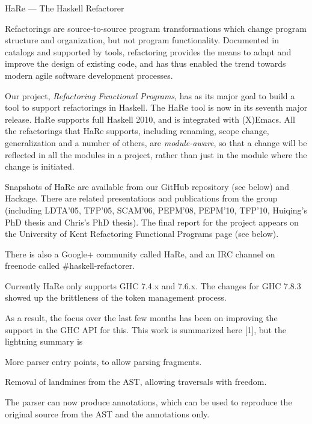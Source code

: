 \begin{hcarentry}[updated]{HaRe --- The Haskell Refactorer}
\label{hare}
\makeheader

Refactorings are source-to-source program transformations which change
program structure and organization, but not program functionality.
Documented in catalogs and supported by tools, refactoring provides
the means to adapt and improve the design of existing code, and has
thus enabled the trend towards modern agile software development
processes.

Our project, \emph{Refactoring Functional Programs}, has as its major
goal to build a tool to support refactorings in Haskell. The HaRe tool
is now in its seventh major release. HaRe supports full Haskell 2010,
and is integrated with (X)Emacs. All the refactorings that HaRe
supports, including renaming, scope change, generalization and a
number of others, are \emph{module-aware}, so that a change will be
reflected in all the modules in a project, rather than just in the
module where the change is initiated.

Snapshots of HaRe are available from our GitHub repository (see below)
and Hackage. There are related presentations and publications from the
group (including LDTA'05, TFP'05, SCAM'06, PEPM'08, PEPM'10, TFP'10,
Huiqing's PhD thesis and Chris's PhD thesis). The final report for the
project appears on the University of Kent Refactoring Functional
Programs page (see below).

There is also a Google+ community called HaRe, and an IRC channel on
freenode called \#haskell-refactorer.

Currently HaRe only supports GHC 7.4.x and 7.6.x. The changes for GHC
7.8.3 showed up the brittleness of the token management process.

As a result, the focus over the last few months has been on improving
the support in the GHC API for this. This work is summarized here [1], but
the lightning summary is

\begin{compactitem}

\item More parser entry points, to allow parsing fragments.
\item Removal of landmines from the AST, allowing traversals with
  freedom.
\item The parser can now produce annotations, which can be used to
  reproduce the original source from the AST and the annotations only.


\end{compactitem}
\end{hcarentry}
